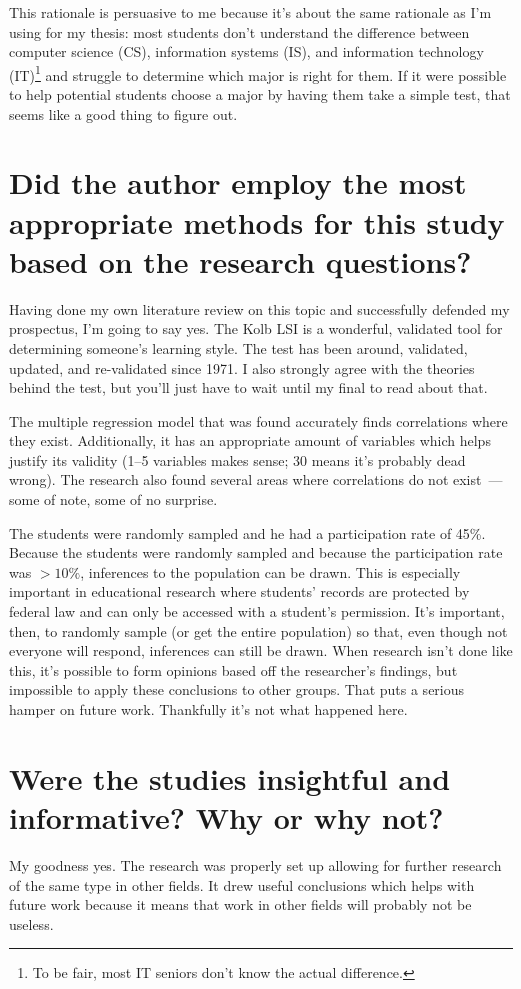 \documentclass[12pt]{article}
\begin{document}
This rationale is persuasive to me because it's about the same rationale as I'm using for my thesis: most students don't understand the difference between computer science (CS), information systems (IS), and information technology (IT)\footnote{To be fair, most IT seniors don't know the actual difference.} and struggle to determine which major is right for them. If it were possible to help potential students choose a major by having them take a simple test, that seems like a good thing to figure out.

\section{Did the author employ the most appropriate methods for this study based on the research questions?}
Having done my own literature review on this topic and successfully defended my prospectus, I'm going to say yes. The Kolb LSI is a wonderful, validated tool for determining someone's learning style. The test has been around, validated, updated, and re-validated since 1971. I also strongly agree with the theories behind the test, but you'll just have to wait until my final to read about that.

The multiple regression model that was found accurately finds correlations where they exist. Additionally, it has an appropriate amount of variables which helps justify its validity (1--5 variables makes sense; 30 means it's probably dead wrong). The research also found several areas where correlations do not exist~--- some of note, some of no surprise.

The students were randomly sampled and he had a participation rate of 45\%. Because the students were randomly sampled and because the participation rate was $>10\%$, inferences to the population can be drawn. This is especially important in educational research where students' records are protected by federal law and can only be accessed with a student's permission. It's important, then, to randomly sample (or get the entire population) so that, even though not everyone will respond, inferences can still be drawn. When research isn't done like this, it's possible to form opinions based off the researcher's findings, but impossible to apply these conclusions to other groups. That puts a serious hamper on future work. Thankfully it's not what happened here.

\section{Were the studies insightful and informative? Why or why not?}
My goodness yes. The research was properly set up allowing for further research of the same type in other fields. It drew useful conclusions which helps with future work because it means that work in other fields will probably not be useless.
\end{document}
